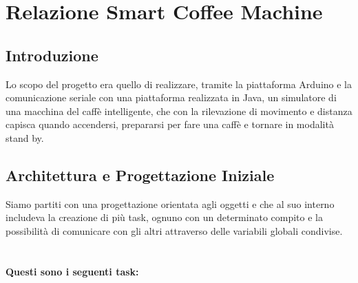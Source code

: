 \documentclass[a4paper]{article}
\begin{document}
\section*{Relazione Smart Coffee Machine} 
\subsection*{Introduzione}
Lo scopo del progetto era quello di realizzare, tramite la piattaforma Arduino e la comunicazione seriale con una piattaforma realizzata in Java, un simulatore di una macchina del caffè intelligente, che con la rilevazione di movimento e distanza capisca quando accendersi, prepararsi per fare una caffè e tornare in modalità stand by.
\subsection*{Architettura e Progettazione Iniziale}
Siamo partiti con una progettazione orientata agli oggetti e che al suo interno includeva la creazione di più task, ognuno con un determinato compito e la possibilità di comunicare con gli altri attraverso delle variabili globali condivise.
\\ \\ \\
\textbf{Questi sono i seguenti task:}
\end{document}
